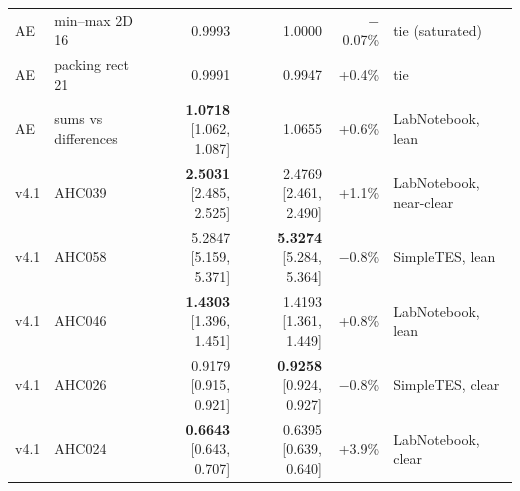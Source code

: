 \begin{table}[H]
\begin{tabular}{@{}llrrrl@{}}
AE & min--max 2D 16 & 0.9993 & 1.0000 & $-$0.07\% & tie (saturated) \\
AE & packing rect 21 & 0.9991 & 0.9947 & +0.4\% & tie \\
AE & sums vs differences & \textbf{1.0718} [1.062, 1.087] & 1.0655 & +0.6\% & LabNotebook, lean \\
v4.1 & AHC039 & \textbf{2.5031} [2.485, 2.525] & 2.4769 [2.461, 2.490] & +1.1\% & LabNotebook, near-clear \\
v4.1 & AHC058 & 5.2847 [5.159, 5.371] & \textbf{5.3274} [5.284, 5.364] & $-$0.8\% & SimpleTES, lean \\
v4.1 & AHC046 & \textbf{1.4303} [1.396, 1.451] & 1.4193 [1.361, 1.449] & +0.8\% & LabNotebook, lean \\
v4.1 & AHC026 & 0.9179 [0.915, 0.921] & \textbf{0.9258} [0.924, 0.927] & $-$0.8\% & SimpleTES, clear \\
v4.1 & AHC024 & \textbf{0.6643} [0.643, 0.707] & 0.6395 [0.639, 0.640] & +3.9\% & LabNotebook, clear \\
\bottomrule
\end{tabular}
\end{table}


